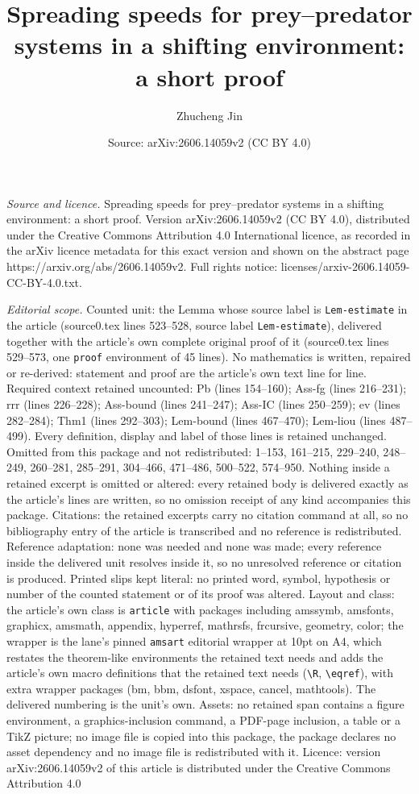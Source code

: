 \documentclass[10pt,a4paper]{amsart}
\title[Spreading speeds for prey--predator systems in a shifting en]{Spreading speeds for prey--predator systems in a shifting environment: a short proof}
\author{Zhucheng Jin}
\date{Source: arXiv:2606.14059v2 (CC BY 4.0)}
\begin{document}
\maketitle

\noindent\emph{Source and licence.} Spreading speeds for prey--predator systems in a shifting environment: a short proof. Version arXiv:2606.14059v2 (CC BY 4.0), distributed under the Creative Commons Attribution 4.0 International licence, as recorded in the arXiv licence metadata for this exact version and shown on the abstract page https://arxiv.org/abs/2606.14059v2. Full rights notice: licenses/arxiv-2606.14059-CC-BY-4.0.txt.\par\smallskip

\noindent\textit{Editorial scope.} Counted unit: the Lemma whose source label is \texttt{Lem-estimate} in the article (source0.tex lines 523--528, source label \texttt{Lem-estimate}), delivered together with the article's own complete original proof of it (source0.tex lines 529--573, one \texttt{proof} environment of 45 lines). No mathematics is written, repaired or re-derived: statement and proof are the article's own text line for line. Required context retained uncounted: Pb (lines 154--160); Ass-fg (lines 216--231); rrr (lines 226--228); Ass-bound (lines 241--247); Ass-IC (lines 250--259); ev (lines 282--284); Thm1 (lines 292--303); Lem-bound (lines 467--470); Lem-liou (lines 487--499). Every definition, display and label of those lines is retained unchanged. Omitted from this package and not redistributed: 1--153, 161--215, 229--240, 248--249, 260--281, 285--291, 304--466, 471--486, 500--522, 574--950. Nothing inside a retained excerpt is omitted or altered: every retained body is delivered exactly as the article's lines are written, so no omission receipt of any kind accompanies this package. Citations: the retained excerpts carry no citation command at all, so no bibliography entry of the article is transcribed and no reference is redistributed. Reference adaptation: none was needed and none was made; every reference inside the delivered unit resolves inside it, so no unresolved reference or citation is produced. Printed slips kept literal: no printed word, symbol, hypothesis or number of the counted statement or of its proof was altered. Layout and class: the article's own class is \texttt{article} with packages including amssymb, amsfonts, graphicx, amsmath, appendix, hyperref, mathrsfs, frcursive, geometry, color; the wrapper is the lane's pinned \texttt{amsart} editorial wrapper at 10pt on A4, which restates the theorem-like environments the retained text needs and adds the article's own macro definitions that the retained text needs (\texttt{\textbackslash R}, \texttt{\textbackslash eqref}), with extra wrapper packages (bm, bbm, dsfont, xspace, cancel, mathtools). The delivered numbering is the unit's own. Assets: no retained span contains a figure environment, a graphics-inclusion command, a PDF-page inclusion, a table or a TikZ picture; no image file is copied into this package, the package declares no asset dependency and no image file is redistributed with it. Licence: version arXiv:2606.14059v2 of this article is distributed under the Creative Commons Attribution 4.0 
\end{document}
